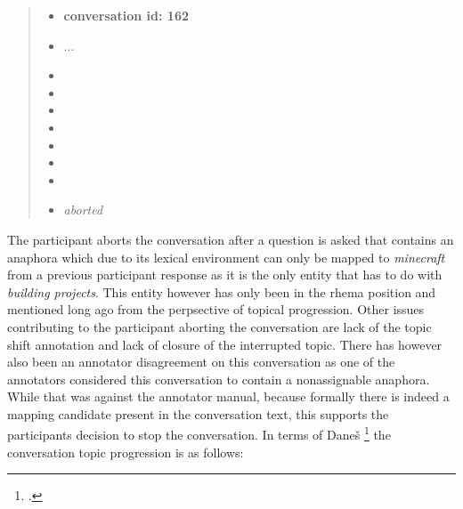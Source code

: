     \begin{quote}
    \begin{itemize}[label={}, leftmargin=0pt, itemsep=0.5em]
    \item \textbf{conversation id: 162}
    \item ...
    \item {}
    \item {}
    \item {}
    \item {}
    \item {}
    \item {}
    \item {}
    \item \textit{aborted}
    \end{itemize}
    \end{quote}


    The participant aborts the conversation after a question is asked that contains an anaphora
    which due to its lexical environment can only be mapped to \textit{minecraft} from a previous participant response
    as it is the only entity that has to do with \textit{building projects}.
    This entity however has only been in the rhema position and mentioned long ago from the perpsective of topical progression.
    Other issues contributing to the participant aborting the conversation are lack of the topic shift annotation
    and lack of closure of the interrupted topic.
    There has however also been an annotator disagreement on this conversation
    as one of the annotators considered this conversation to contain a nonassignable anaphora.
    While that was against the annotator manual,
    because formally there is indeed a mapping candidate present in the conversation text,
    this supports the participants decision to stop the conversation.
    In terms of Daneš \footcite{danevs1989functional} the conversation topic progression is as follows:

